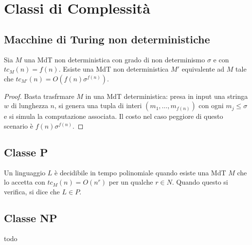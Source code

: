 \section{Classi di Complessità}

\subsection{Macchine di Turing non deterministiche}

\begin{lemm}
	Sia $M$ una MdT non deterministica con grado di non determinismo $\sigma$ e con $tc_M(n) = f(n)$. Esiste una MdT non deterministica $M'$ equivalente ad $M$ tale che $tc_{M'}(n) = O(f(n)\sigma^{f(n)})$.
\end{lemm}

\begin{proof}
	Basta trasfrmare $M$ in una MdT deterministica: presa in input una stringa $w$ di lunghezza $n$, si genera una tupla di interi $(m_1, \ldots, m_{f(n)})$ con ogni $m_j \leq \sigma$ e si simula la computazione associata. Il costo nel caso peggiore di questo scenario è $f(n)\sigma^{f(n)}$.
\end{proof}

\subsection{Classe P}

\begin{defn}
	Un linguaggio $L$ è decidibile in tempo polinomiale quando esiste una MdT $M$ che lo accetta con $tc_M(n) = O(n^r)$ per un qualche $r \in N$. Quando questo si verifica, si dice che $L \in P$.
\end{defn}

\subsection{Classe NP}

\begin{defn}
	todo
\end{defn}
